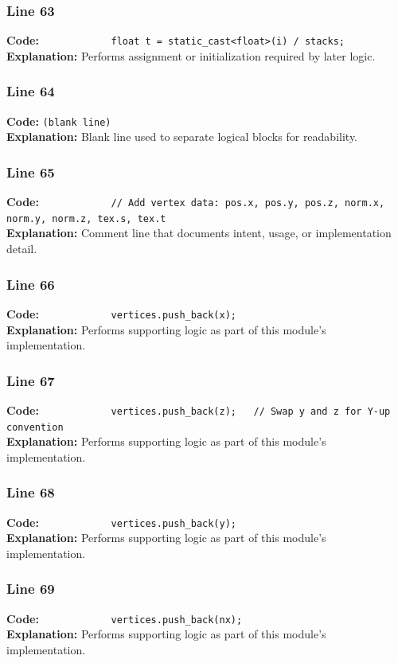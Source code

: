 \documentclass[11pt,a4paper]{article}
\begin{document}
\subsubsection*{Line 63}
\textbf{Code:} \verb|            float t = static_cast<float>(i) / stacks;|\\
\textbf{Explanation:} Performs assignment or initialization required by later logic.

\subsubsection*{Line 64}
\textbf{Code:} \texttt{(blank line)}\\
\textbf{Explanation:} Blank line used to separate logical blocks for readability.

\subsubsection*{Line 65}
\textbf{Code:} \verb|            // Add vertex data: pos.x, pos.y, pos.z, norm.x, norm.y, norm.z, tex.s, tex.t|\\
\textbf{Explanation:} Comment line that documents intent, usage, or implementation detail.

\subsubsection*{Line 66}
\textbf{Code:} \verb|            vertices.push_back(x);|\\
\textbf{Explanation:} Performs supporting logic as part of this module's implementation.

\subsubsection*{Line 67}
\textbf{Code:} \verb|            vertices.push_back(z);   // Swap y and z for Y-up convention|\\
\textbf{Explanation:} Performs supporting logic as part of this module's implementation.

\subsubsection*{Line 68}
\textbf{Code:} \verb|            vertices.push_back(y);|\\
\textbf{Explanation:} Performs supporting logic as part of this module's implementation.

\subsubsection*{Line 69}
\textbf{Code:} \verb|            vertices.push_back(nx);|\\
\textbf{Explanation:} Performs supporting logic as part of this module's implementation.
\end{document}

